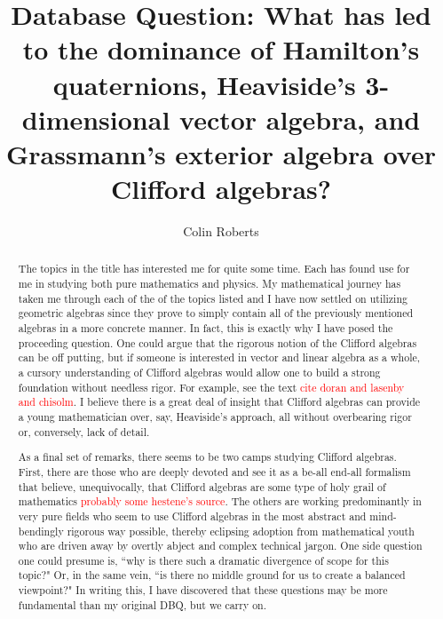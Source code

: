 \documentclass[12pt]{article}
\title{Database Question: What has led to the dominance of Hamilton's quaternions, Heaviside's 3-dimensional vector algebra, and Grassmann's exterior algebra over Clifford algebras?}
\author{Colin Roberts}
\begin{document}
 \begin{titlingpage}
     \maketitle
     \vfill
     \begin{abstract}
        The topics in the title has interested me for quite some time. Each has found use for me in studying both pure mathematics and physics. My mathematical journey has taken me through each of the  of the topics listed and I have now settled on utilizing geometric algebras since they prove to simply contain all of the previously mentioned algebras in a more concrete manner. In fact, this is exactly why I have posed the proceeding question. One could argue that the rigorous notion of the Clifford algebras can be off putting, but if someone is interested in vector and linear algebra as a whole, a cursory understanding of Clifford algebras would allow one to build a strong foundation without needless rigor. For example, see the text \textcolor{red}{cite doran and lasenby and chisolm}. I believe there is a great deal of insight that Clifford algebras can provide a young mathematician over, say, Heaviside's approach, all without overbearing rigor or, conversely, lack of detail.

        As a final set of remarks, there seems to be two camps studying Clifford algebras. First, there are those who are deeply devoted and see it as a be-all end-all formalism that believe, unequivocally, that Clifford algebras are some type of holy grail of mathematics \textcolor{red}{probably some hestene's source}. The others are working predominantly in very pure fields who seem to use Clifford algebras in the most abstract and mind-bendingly rigorous way possible, thereby eclipsing adoption from mathematical youth who are driven away by overtly abject and complex technical jargon. One side question one could presume is, ``why is there such a dramatic divergence of scope for this topic?" Or, in the same vein, ``is there no middle ground for us to create a balanced viewpoint?" In writing this, I have discovered that these questions may be more fundamental than my original DBQ, but we carry on.
     \end{abstract}
 \end{titlingpage}
\end{document}
